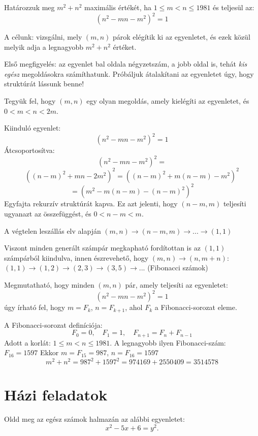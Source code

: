 \begin{problem}
	Határozzuk meg $m^{2}+n^{2}$ maximális értékét,
	ha $1\leq m<n\leq1981$ és teljesül az:
	\[
	(n^{2}-mn-m^{2})^{2}=1
	\]
\end{problem}
\begin{solution} 
	
	A célunk: vizsgálni, mely $(m,n)$ párok elégítik ki az egyenletet,
	és ezek közül melyik adja a legnagyobb $m^{2}+n^{2}$ értéket. 
	
	Első megfigyelés: az egyenlet bal oldala négyzetszám, a jobb oldal
	is, tehát \emph{kis egész} megoldásokra számíthatunk. 
	Próbáljuk átalakítani az egyenletet úgy, hogy struktúrát lássunk
	benne!
	
	Tegyük fel, hogy $(m,n)$ egy olyan megoldás, amely kielégíti az
	egyenletet, és $0<m<n<2m$. 
	
	Kiinduló egyenlet: 
	\[
	(n^{2}-mn-m^{2})^{2}=1
	\]
	Átcsoportosítva: 
	\[
	(n^{2}-mn-m^{2})^{2}=
	\]
	\[
	((n-m)^{2}+mn-2m^{2})^{2}=((n-m)^{2}+m(n-m)-m^{2})^{2}
	\]
	\[
	=(m^{2}-m(n-m)-(n-m)^{2})^{2}
	\]
	Egyfajta rekurzív struktúrát kapva. Ez azt jelenti, hogy $(n-m,m)$ teljesíti ugyanazt az összefüggést,
	és $0<n-m<m$.
	
	A végtelen leszállás elv alapján $(m,n)\rightarrow(n-m,m)\rightarrow...\rightarrow(1,1)$ 
	
	Viszont minden generált számpár megkapható fordítottan is az $(1,1)$
	számpárból kiindulva, innen észrevehető, hogy $(m,n)\rightarrow(n,m+n)$: 
	$(1,1)\rightarrow(1,2)\rightarrow(2,3)\rightarrow(3,5)\rightarrow...$
	(Fibonacci számok) 
	
	Megmutatható, hogy minden $(m,n)$ pár, amely teljesíti az egyenletet:
	\[
	(n^{2}-mn-m^{2})^{2}=1
	\]
	úgy írható fel, hogy $m=F_{k}$, $n=F_{k+1}$, ahol $F_{k}$ a Fibonacci-sorozat
	eleme.
	
	A Fibonacci-sorozat definíciója: 
	\[
	F_{0}=0,\quad F_{1}=1,\quad F_{n+1}=F_{n}+F_{n-1}
	\]
	Adott a korlát: $1\leq m<n\leq1981$. A legnagyobb ilyen Fibonacci-szám: $F_{16}=1597$
	Ekkor $m=F_{15}=987$, $n=F_{16}=1597$ 
	\[
	m^{2}+n^{2}=987^{2}+1597^{2}=974169+2550409=\boxed{3514578}
	\]
\end{solution}

\section*{Házi feladatok}
\begin{problem}
	Oldd meg az egész számok halmazán az alábbi egyenletet: 
	\[
	x^{2}-5x+6=y^{2}.
	\]
\end{problem}

